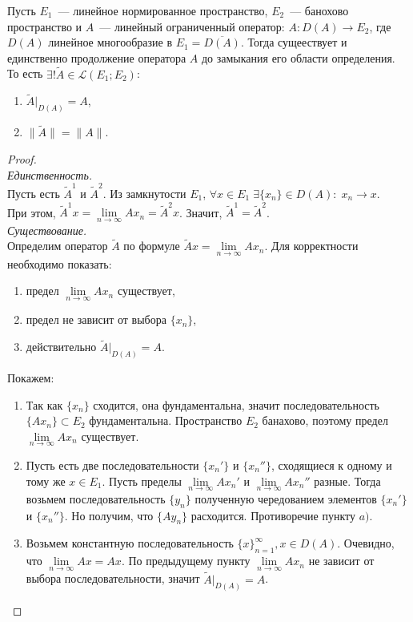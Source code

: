 \begin{theorem}\label{extrapolate-to-closure}
    Пусть $E_1$~--- линейное нормированное пространство, $E_2$~--- банохово пространство и $A$~--- линейный ограниченный оператор: $A: D(A) \to E_2$, где $D(A)$ линейное многообразие в $E_1 = \overline{D(A)}$. Тогда сущеествует и единственно продолжение оператора $A$ до замыкания его области определения.\\
    То есть $\exists! \widetilde{A} \in \mathcal{L}(E_1; E_2)$:
    \begin{enumerate}
        \item $ \widetilde{A}\rvert_{D(A)} = A$,
        \item $\|\widetilde{A}\| = \|A\|$.
    \end{enumerate}
\end{theorem}
\begin{proof}\\
    \noindent\textit{Единственность.}\\
    Пусть есть $\widetilde{A}^1$ и $\widetilde{A}^2$. Из замкнутости $E_1$, 
    \(\forall x \in E_1 \; \exists \{x_n\} \in D(A):\; x_n \to x.\)\\
    При этом, $\widetilde{A}^1 x = \lim\limits_{n \to \infty} Ax_n = \widetilde{A}^2 x$. Значит, $\widetilde{A}^1 = \widetilde{A}^2$.
    \\
    \noindent\textit{Существование.}\\
    Определим оператор $\widetilde{A}$ по формуле $\widetilde{A}x = \lim\limits_{n \to \infty} Ax_n$. Для корректности необходимо показать:
    \begin{enumerate}[label=\alph*)]
        \item предел $\lim\limits_{n \to \infty} Ax_n$ существует,
        \item предел не зависит от выбора $\{x_n\}$,
        \item действительно $\widetilde{A}\rvert_{D(A)} = A$.
    \end{enumerate}
    Покажем:
    \begin{enumerate}[label=\alph*)]
        \item Так как $\{x_n\}$ сходится, она фундаментальна, значит последовательность $\{Ax_n\} \subset E_2$ фундаментальна. Пространство $E_2$ банахово, поэтому предел $\lim\limits_{n \to \infty} Ax_n$ существует.
        \item Пусть есть две последовательности $\{x_n'\}$ и $\{x_n''\}$, сходящиеся к одному и тому же $x \in E_1$. Пусть пределы $\lim\limits_{n \to \infty} Ax_n'$ и $\lim\limits_{n \to \infty} Ax_n''$ разные. Тогда возьмем последовательность
        $\{y_n\}$ полученную чередованием элементов $\{x_n'\}$ и $\{x_n''\}$. Но получим, что $\{Ay_n\}$ расходится. Противоречие пункту $a)$.
        \item Возьмем константную последовательность $\{x\}_{n=1}^{\infty}, x \in D(A)$. Очевидно, что $\lim\limits_{n \to \infty} Ax = Ax$. По предыдущему пункту $\lim\limits_{n \to \infty} Ax_n$ не зависит от выбора последовательности, значит $\widetilde{A}\rvert_{D(A)} = A$.
    \end{enumerate}


\end{proof}
